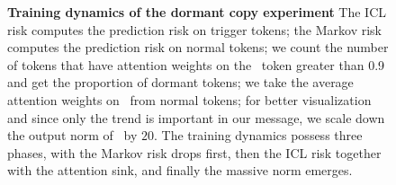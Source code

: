 \begin{figure}[t]
  \vspace{-1em}
  \caption{\small \textbf{Training dynamics of the dormant copy experiment} The ICL risk computes the prediction risk on trigger tokens; the Markov risk computes the prediction risk on normal tokens; we count the number of tokens that have attention weights on the \bos~token greater than 0.9 and get the proportion of dormant tokens; we take the average attention weights on \bos~from normal tokens; for better visualization and since only the trend is important in our message, we scale down the output norm of \bos~by $20$. The training dynamics possess three phases, with the Markov risk drops first, then the ICL risk together with the attention sink, and finally the massive norm emerges.}
  \label{figure:pretraining-dynamics}
  \vspace{-1em}
\end{figure}
